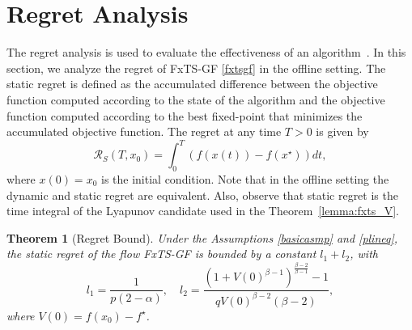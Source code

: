 \documentclass[letterpaper]{article}
\newtheorem{theorem}{Theorem}
\begin{document}
\section{Regret Analysis} \label{sec: regret analysis}
The regret analysis is used to evaluate the effectiveness of an algorithm~\cite{sun2020continuous}. In this section, we analyze the regret of FxTS-GF \eqref{fxtsgf} in the offline setting. The static regret is defined as the accumulated difference between the objective function computed according to the state of the algorithm and the objective function computed according to the best fixed-point that minimizes the accumulated objective function. The regret at any time $T\!>\!0$ is given by
\begin{equation*}
    \mathcal{R}_S (T,x_0)= \int_0^T \left( f(x(t)) -f(x^\star)\right)dt,
\end{equation*}
where $x(0)=x_0$ is the initial condition. Note that in the offline setting the dynamic and static regret are equivalent. Also, observe that static regret is the time integral of the Lyapunov candidate used in the Theorem~\ref{lemma:fxts_V}.
\begin{theorem}[Regret Bound]\label{thm:Regret}
    Under the Assumptions \ref{basicasmp} and \ref{plineq}, the static regret of the flow FxTS-GF is bounded by a constant $l_1 +l_2$, with 
    \begin{equation*}
    l_1 = \frac{1}{p(2-\alpha)}, \quad l_2= \frac{(1+V(0)^{\beta-1})^{\frac{\beta-2}{\beta-1}}-1}{qV(0)^{\beta-2}(\beta-2)},
    \end{equation*}
    where $V(0)=f(x_0)-f^\star$.
\end{theorem}
\end{document}
